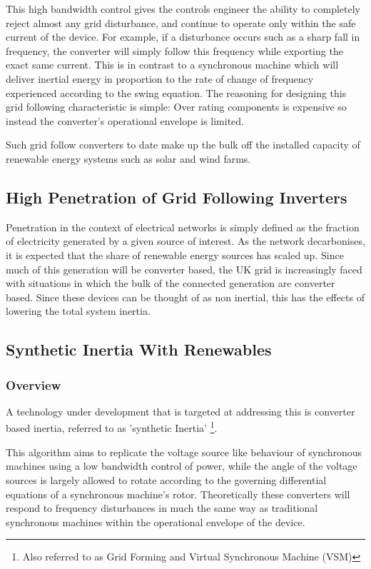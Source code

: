 \documentclass[11pt]{article}
\numberwithin{equation}{section}
\begin{document}
This high bandwidth control gives the controls engineer the ability to completely reject almost any grid disturbance, and continue to operate only within the safe current of the device. For example, if a disturbance occurs such as a sharp fall in frequency, the converter will simply follow this frequency while exporting the exact same current. This is in contrast to a synchronous machine which will deliver inertial energy in proportion to the rate of change of frequency experienced according to the swing equation. The reasoning for designing this grid following characteristic is simple: Over rating components is expensive so instead the converter's operational envelope is limited.

Such grid follow converters to date make up the bulk off the installed capacity of renewable energy systems such as solar and wind farms.

\subsection{High Penetration of Grid Following Inverters}
\label{sec:org60424eb}
Penetration in the context of electrical networks is simply defined as the fraction of electricity generated by a given source of interest. As the network decarbonises, it is expected that the share of renewable energy sources has scaled up. Since much of this generation will be converter based, the UK grid is increasingly faced with situations in which the bulk of the connected generation are converter based. Since these devices can be thought of as non inertial, this has the effects of lowering the total system inertia.

\subsection{Synthetic Inertia With Renewables}
\label{sec:orgb89b220}
\subsubsection{Overview}
\label{sec:orgc9c6f02}
A technology under development that is targeted at addressing this is converter based inertia, referred to as 'synthetic Inertia' \footnote{Also referred to as Grid Forming and Virtual Synchronous Machine (VSM)}.

This algorithm aims to replicate the voltage source like behaviour of synchronous machines using a low bandwidth control of power, while the angle of the voltage sources is largely allowed to rotate according to the governing differential equations of a synchronous machine's rotor. Theoretically these converters will respond to frequency disturbances in much the same way as traditional synchronous machines within the operational envelope of the device.
\end{document}
